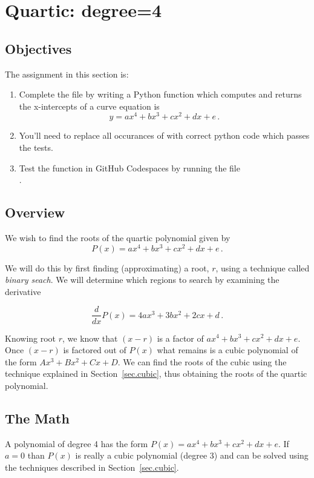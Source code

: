 \section{Quartic: degree=4}
\label{sec.quartic}

\subsection{Objectives}
The assignment in this section is:
\begin{enumerate}
\item Complete the file  by writing a Python
  function which computes and returns the x-intercepts of a curve
  equation is \[y=a x^4 + b x^3 + c x^2 + d x + e\,.\]
\item You'll need to replace all occurances of 
  with correct python code which passes the tests.
\item Test the function in GitHub Codespaces by running the file\\
  .
\end{enumerate}

\subsection{Overview}

We wish to find the roots of the quartic polynomial given by 
\[P(x) = ax^4 + b x^3 + c x^2 + d x + e\,.\]

We will do this by first finding
(approximating) a root, $r$, using a technique called \emph{binary
seach}.  We will determine which regions to search by examining the derivative

\[\frac{d}{dx} P(x) = 4ax^3 + 3b x^2 + 2c x + d\,.\]

Knowing root $r$, we know that $(x-r)$ is a factor of 
$a x^4 + b x^3 + c x^2 + d x + e$.  Once $(x-r)$ is factored out of $P(x)$
what remains is a cubic polynomial of the form $A x^3 + B x^2 + C x + D$.
We can find the roots of the cubic using the technique
explained in Section~\ref{sec.cubic}, thus obtaining the roots of
the quartic polynomial.


\subsection{The Math}


A polynomial of degree 4 has the form $P(x) = a x^4 + b x^3 + c x^2 +
d x + e$. If $a=0$ than $P(x)$ is really a cubic polynomial (degree 3)
and can be solved using the techniques described in
Section~\ref{sec.cubic}.

